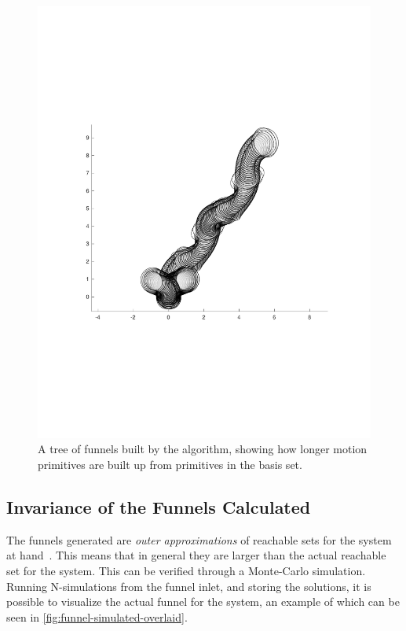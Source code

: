 \begin{figure}[!t]
  \centering
  \includegraphics[scale=.4, trim={0cm 7cm 0cm
    7cm}]{figures/method/funnel-tree} \caption[A tree of funnels built by the
  \rrtfunnel{} algorithm]{A tree of funnels built by the \rrtfunnel{} algorithm,
    showing how longer motion primitives are built up from primitives in the
    basis set.}
  \label{fig:funnel-composition-tree}
\end{figure}


\subsection{Invariance of the Funnels Calculated}

The funnels generated are \textit{outer approximations} of reachable sets for
the system at hand~\cite{majumdarFunnelLibrariesRealtime2017}. This means that
in general they are larger than the actual reachable set for the system. This
can be verified through a Monte-Carlo simulation. Running N-simulations from the
funnel inlet, and storing the solutions, it is possible to visualize the actual
funnel for the system, an example of which can be seen in
\cref{fig:funnel-simulated-overlaid}.

